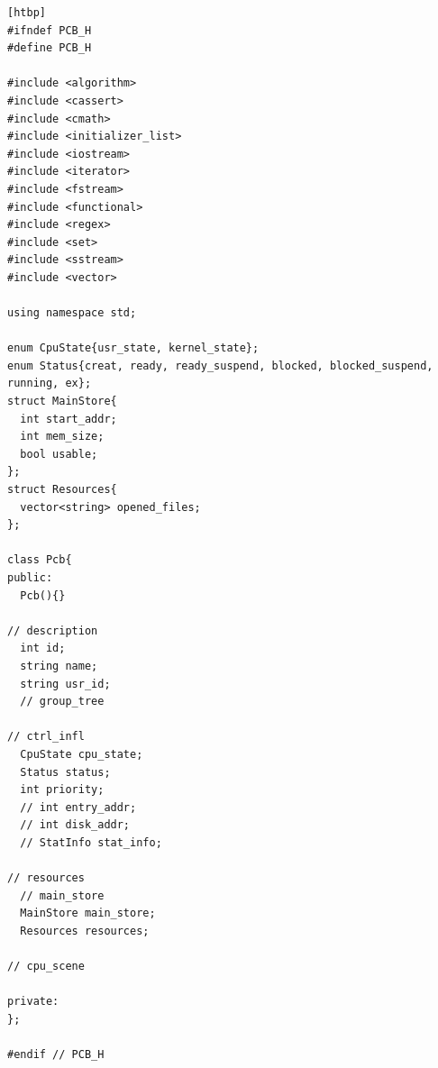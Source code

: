 \documentclass[11pt]{article}
\begin{document}
\begin{center}
\begin{lstlisting}[caption = {\texttt{pcb.h}代码清单}, label = {lst: pcb_h}][htbp]
#ifndef PCB_H
#define PCB_H

#include <algorithm>
#include <cassert>
#include <cmath>
#include <initializer_list>
#include <iostream>
#include <iterator>
#include <fstream>
#include <functional>
#include <regex>
#include <set>
#include <sstream>
#include <vector>

using namespace std;

enum CpuState{usr_state, kernel_state};
enum Status{creat, ready, ready_suspend, blocked, blocked_suspend, running, ex};
struct MainStore{
  int start_addr;
  int mem_size;
  bool usable;
};
struct Resources{
  vector<string> opened_files;
};

class Pcb{
public:
  Pcb(){}

// description
  int id;
  string name;
  string usr_id;
  // group_tree

// ctrl_infl
  CpuState cpu_state;
  Status status;
  int priority;
  // int entry_addr;
  // int disk_addr;
  // StatInfo stat_info;

// resources
  // main_store
  MainStore main_store;
  Resources resources;

// cpu_scene

private:
};

#endif // PCB_H
\end{lstlisting}
\end{center}
\end{document}
